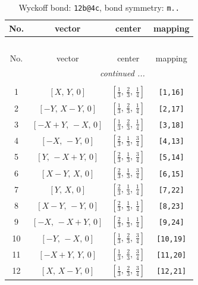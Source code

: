 \documentclass[fleqn,8pt]{jsarticle}
\begin{document}
\begin{longtable}{cccc}
\caption{Wyckoff bond: {\tt 12b@4c}, bond symmetry: {\tt m..}}
 \\
 \hline \hline
No. & vector & center & mapping \\ \hline \endfirsthead

\multicolumn{3}{l}{\tablename\ \thetable{}} \\
 \hline \hline
No. & vector & center & mapping \\ \hline \endhead

 \hline \hline
\multicolumn{3}{r}{\footnotesize\it continued ...} \\ \endfoot

 \hline \hline
\multicolumn{3}{r}{} \\ \endlastfoot

1 & $\left[ X,\, Y,\, 0 \right]$ & $\left[ \frac{1}{3},\, \frac{2}{3},\, \frac{1}{4} \right]$ & {\tt [1,16]} \\ \hline
2 & $\left[ - Y,\, X - Y,\, 0 \right]$ & $\left[ \frac{1}{3},\, \frac{2}{3},\, \frac{1}{4} \right]$ & {\tt [2,17]} \\ \hline
3 & $\left[ - X + Y,\, - X,\, 0 \right]$ & $\left[ \frac{1}{3},\, \frac{2}{3},\, \frac{1}{4} \right]$ & {\tt [3,18]} \\ \hline
4 & $\left[ - X,\, - Y,\, 0 \right]$ & $\left[ \frac{2}{3},\, \frac{1}{3},\, \frac{3}{4} \right]$ & {\tt [4,13]} \\ \hline
5 & $\left[ Y,\, - X + Y,\, 0 \right]$ & $\left[ \frac{2}{3},\, \frac{1}{3},\, \frac{3}{4} \right]$ & {\tt [5,14]} \\ \hline
6 & $\left[ X - Y,\, X,\, 0 \right]$ & $\left[ \frac{2}{3},\, \frac{1}{3},\, \frac{3}{4} \right]$ & {\tt [6,15]} \\ \hline
7 & $\left[ Y,\, X,\, 0 \right]$ & $\left[ \frac{2}{3},\, \frac{1}{3},\, \frac{1}{4} \right]$ & {\tt [7,22]} \\ \hline
8 & $\left[ X - Y,\, - Y,\, 0 \right]$ & $\left[ \frac{2}{3},\, \frac{1}{3},\, \frac{1}{4} \right]$ & {\tt [8,23]} \\ \hline
9 & $\left[ - X,\, - X + Y,\, 0 \right]$ & $\left[ \frac{2}{3},\, \frac{1}{3},\, \frac{1}{4} \right]$ & {\tt [9,24]} \\ \hline
10 & $\left[ - Y,\, - X,\, 0 \right]$ & $\left[ \frac{1}{3},\, \frac{2}{3},\, \frac{3}{4} \right]$ & {\tt [10,19]} \\ \hline
11 & $\left[ - X + Y,\, Y,\, 0 \right]$ & $\left[ \frac{1}{3},\, \frac{2}{3},\, \frac{3}{4} \right]$ & {\tt [11,20]} \\ \hline
12 & $\left[ X,\, X - Y,\, 0 \right]$ & $\left[ \frac{1}{3},\, \frac{2}{3},\, \frac{3}{4} \right]$ & {\tt [12,21]} \\
\end{longtable}
\end{document}
